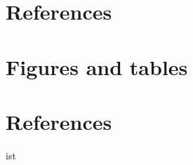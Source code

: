 \documentclass[
  authoryear,
  preprint,
  onecolumn]{elsarticle}
\begin{document}
\hypertarget{references}{%
\section{References}\label{references}}

\hypertarget{figures-and-tables}{%
\section{Figures and tables}\label{figures-and-tables}}

\hypertarget{references-1}{%
\section*{References}\label{references-1}}

ist


  
\end{document}
